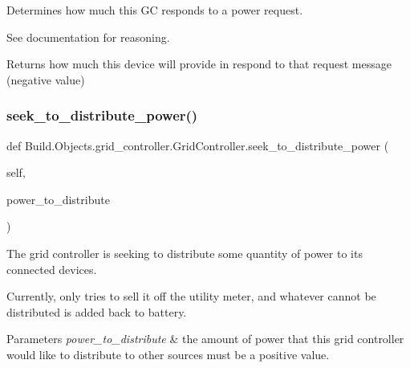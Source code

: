 Determines how much this GC responds to a power request. 

See documentation for reasoning. \begin{DoxyReturn}{Returns}
how much this device will provide in respond to that request message (negative value) 
\end{DoxyReturn}
\mbox{\label{class_build_1_1_objects_1_1grid__controller_1_1_grid_controller_ad85f2d1459669fe5be0d3c046c23a54b}} 
\subsubsection{\texorpdfstring{seek\+\_\+to\+\_\+distribute\+\_\+power()}{seek\_to\_distribute\_power()}}
{\footnotesize\ttfamily def Build.\+Objects.\+grid\+\_\+controller.\+Grid\+Controller.\+seek\+\_\+to\+\_\+distribute\+\_\+power (\begin{DoxyParamCaption}\item[{}]{self,  }\item[{}]{power\+\_\+to\+\_\+distribute }\end{DoxyParamCaption})}



The grid controller is seeking to distribute some quantity of power to its connected devices. 

Currently, only tries to sell it off the utility meter, and whatever cannot be distributed is added back to battery.


\begin{DoxyParams}{Parameters}
{\em power\+\_\+to\+\_\+distribute} & the amount of power that this grid controller would like to distribute to other sources must be a positive value. \\
\hline
\end{DoxyParams}
\mbox{\label{class_build_1_1_objects_1_1grid__controller_1_1_grid_controller_ade27791e0e81bcb55583e7e711b9b5d0}} 
